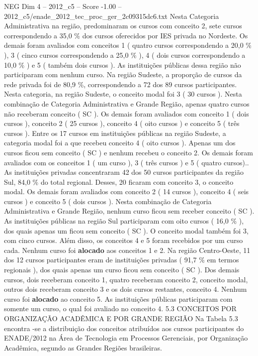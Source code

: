 \begin{textsample}{NEG Dim 4 – 2012\_c5 – Score -1.00 – 2012\_c5/enade\_2012\_tec\_proc\_ger\_2c09315dc6.txt}
Nesta Categoria Administrativa na região, predominaram os cursos com conceito 2, sete cursos correspondendo a 35,0 \% dos cursos oferecidos por IES privada no Nordeste.
Os demais foram avaliados com conceitos 1 ( quatro cursos correspondendo a 20,0 \% ), 3 ( cinco cursos correspondendo a 25,0 \% ), 4 ( dois cursos correspondendo a 10,0 \% ) e 5 ( também dois cursos ).
As instituições públicas dessa região não participaram com nenhum curso.
Na região Sudeste, a proporção de cursos da rede privada foi de 80,9 \%, correspondendo a 72 dos 89 cursos participantes.
Nesta categoria, na região Sudeste, o conceito modal foi 3 ( 30 cursos ).
Nesta combinação de Categoria Administrativa e Grande Região, apenas quatro cursos não receberam conceito ( SC ).
Os demais foram avaliados com conceito 1 ( dois cursos ), conceito 2 ( 25 cursos ), conceito 4 ( oito cursos ) e conceito 5 ( três cursos ).
Entre os 17 cursos em instituições públicas na região Sudeste, a categoria modal foi a que recebeu conceito 4 ( oito cursos ).
Apenas um dos cursos ficou sem conceito ( SC ) e nenhum recebeu o conceito 2.
Os demais foram avaliados com os conceitos 1 ( um curso ), 3 ( três cursos ) e 5 ( quatro cursos)..
As instituições privadas concentraram 42 dos 50 cursos participantes da região Sul, 84,0 \% do total regional.
Desses, 20 ficaram com conceito 3, o conceito modal.
Os demais foram avaliados com conceito 2 ( 14 cursos ), conceito 4 ( seis cursos ) e conceito 5 ( dois cursos ).
Nesta combinação de Categoria Administrativa e Grande Região, nenhum curso ficou sem receber conceito ( SC ).
As instituições públicas na região Sul participaram com oito cursos ( 16,0 \% ), dos quais apenas um ficou sem conceito ( SC ).
O conceito modal também foi 3, com cinco cursos.
Além disso, os conceitos 4 e 5 foram recebidos por um curso cada.
Nenhum curso foi \textbf{alocado} aos conceitos 1 e 2.
Na região Centro-Oeste, 11 dos 12 cursos participantes eram de instituições privadas ( 91,7 \% em termos regionais ), dos quais apenas um curso ficou sem conceito ( SC ).
Dos demais cursos, dois receberam conceito 1, quatro receberam conceito 2, conceito modal, outros dois receberam conceito 3 e os dois cursos restantes, conceito 4.
Nenhum curso foi \textbf{alocado} ao conceito 5.
As instituições públicas participaram com somente um curso, o qual foi avaliado no conceito 4. 5.3 CONCEITOS POR ORGANIZAÇÃO ACADÊMICA E POR GRANDE REGIÃO Na Tabela 5.3 encontra -se a distribuição dos conceitos atribuídos aos cursos participantes do ENADE/2012 na Área de Tecnologia em Processos Gerenciais, por Organização Acadêmica, segundo as Grandes Regiões brasileiras.

\end{textsample}
